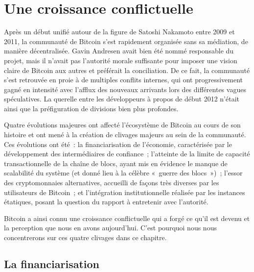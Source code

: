 
\chapter{Une croissance conflictuelle}
\label{ch:2}

Après un début unifié autour de la figure de Satoshi Nakamoto entre 2009 et 2011, la communauté de Bitcoin s'est rapidement organisée sans sa médiation, de manière décentralisée. Gavin Andresen avait bien été nommé responsable du projet, mais il n'avait pas l'autorité morale suffisante pour imposer une vision claire de Bitcoin aux autres et préférait la conciliation. De ce fait, la communauté s'est retrouvée en proie à de multiples conflits internes, qui ont progressivement gagné en intensité avec l'afflux des nouveaux arrivants lors des différentes vagues spéculatives. La querelle entre les développeurs à propos de  début 2012 n'était ainsi que la préfiguration de divisions bien plus profondes.

Quatre évolutions majeures ont affecté l'écosystème de Bitcoin au cours de son histoire et ont mené à la création de clivages majeurs au sein de la communauté. Ces évolutions ont été~: la financiarisation de l'économie, caractérisée par le développement des intermédiaires de confiance~; l'atteinte de la limite de capacité transactionnelle de la chaîne de blocs, ayant mis en évidence le manque de scalabilité du système (et donné lieu à la célèbre «~guerre des blocs~»)~; l'essor des cryptomonnaies alternatives, accueilli de façons très diverses par les utilisateurs de Bitcoin~; et l'intégration institutionnelle réalisée par les instances étatiques, posant la question du rapport à entretenir avec l'autorité.

Bitcoin a ainsi connu une croissance conflictuelle qui a forgé ce qu'il est devenu et la perception que nous en avons aujourd'hui. C'est pourquoi nous nous concentrerons sur ces quatre clivages dans ce chapitre.


\section*{La financiarisation} %

